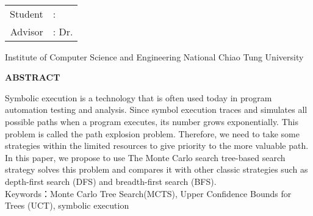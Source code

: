 \begin{titlepage}
  \begin{center}
    \LARGE
    \begin{singlespace}
  	 \textbf{\englishTitle{}} \\[0.5cm]
    \end{singlespace}
    
    \begin{singlespace}
    \begin{tabular}{r l}
    	Student     & : \studentEnName{}  \\
        Advisor  & : Dr. \advisorEnName{} \\[0.5cm]
    \end{tabular}
    \end{singlespace}
	
    \begin{singlespace}
    Institute of Computer Science and Engineering National Chiao Tung University\\[0.5cm]
    \end{singlespace}
    \textbf{ABSTRACT} \\[0.5cm]
    	
  \end{center}
  \normalsize 
  \hspace{0.6cm} Symbolic execution is a technology that is often used today in program automation testing and analysis. Since symbol execution traces and simulates all possible paths when a program executes, its number grows exponentially. This problem is called the path explosion problem. Therefore, we need to take some strategies within the limited resources to give priority to the more valuable path. In this paper, we propose to use The Monte Carlo search tree-based search strategy solves this problem and compares it with other classic strategies such as depth-first search (DFS) and breadth-first search (BFS).
  \\[0.7cm]
  Keywords：Monte Carlo Tree Search(MCTS), Upper Confidence Bounds for Trees (UCT), symbolic execution
\end{titlepage}
